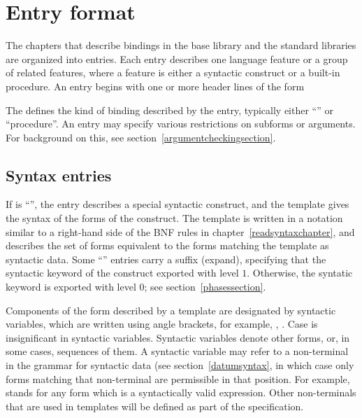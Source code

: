 \chapter{Entry format}
\label{entryformatchapter}

The chapters that describe bindings in the base library and the standard
libraries are organized
into entries.  Each entry describes one language feature or a group of
related features, where a feature is either a syntactic construct or a
built-in procedure.  An entry begins with one or more header lines of the form

\noindent{}\unpenalty

The  defines the kind of binding described by the entry,
typically either ``\exprtype'' or ``procedure''.
An entry may specify various restrictions on subforms or arguments.
For background on this, see section~\ref{argumentcheckingsection}.

\section{Syntax entries}

If  is ``\exprtype'', the entry describes a 
special syntactic construct, and the template gives the syntax of the
forms of the construct.  
The template is written in a notation similar to a right-hand
side of the BNF rules in chapter~\ref{readsyntaxchapter}, and describes
the set of forms equivalent to the forms matching the
template as syntactic data.  Some ``\exprtype'' entries carry a
suffix ({\cf expand}), specifying that the syntactic keyword of the
construct exported with level
$1$.  Otherwise, the syntatic keyword is exported with level $0$; see
section~\ref{phasessection}.

Components of the form described by a template are designated
by syntactic variables, which are written using angle brackets, for
example, , .  Case is insignificant
in syntactic variables.  Syntactic variables
denote other forms, or, in some cases,
sequences of them.  A syntactic variable may refer to a non-terminal
in the grammar for syntactic data (see section~\ref{datumsyntax},
in which case only forms matching
that non-terminal are permissible in that position.  For example,
 stands for any form which is a
syntactically valid expression.  Other non-terminals that are used in
templates will be defined as part of the specification.

